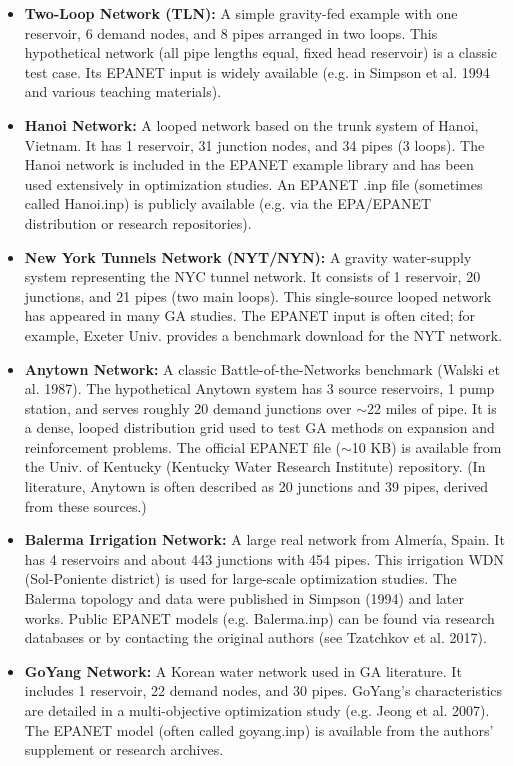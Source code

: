 \documentclass[12pt, a4paper]{article}
\begin{document}
\begin{itemize}
	\item \textbf{Two-Loop Network (TLN):} A simple gravity-fed example with one reservoir, 6 demand nodes, and 8 pipes arranged in two loops\cite{ref18}. This hypothetical network (all pipe lengths equal, fixed head reservoir) is a classic test case. Its EPANET input is widely available (e.g. in Simpson et al. 1994 and various teaching materials).
	\item \textbf{Hanoi Network:} A looped network based on the trunk system of Hanoi, Vietnam. It has 1 reservoir, 31 junction nodes, and 34 pipes (3 loops)\cite{ref19}. The Hanoi network is included in the EPANET example library and has been used extensively in optimization studies\cite{ref19}. An EPANET .inp file (sometimes called Hanoi.inp) is publicly available (e.g. via the EPA/EPANET distribution or research repositories).
	\item \textbf{New York Tunnels Network (NYT/NYN):} A gravity water-supply system representing the NYC tunnel network. It consists of 1 reservoir, 20 junctions, and 21 pipes (two main loops)\cite{ref19}. This single-source looped network has appeared in many GA studies. The EPANET input is often cited; for example, Exeter Univ. provides a benchmark download for the NYT network\cite{ref19}.
	\item \textbf{Anytown Network:} A classic Battle-of-the-Networks benchmark (Walski et al. 1987). The hypothetical Anytown system has 3 source reservoirs, 1 pump station, and serves roughly 20 demand junctions over $\sim$22 miles of pipe\cite{ref20}. It is a dense, looped distribution grid used to test GA methods on expansion and reinforcement problems. The official EPANET file ($\sim$10 KB) is available from the Univ. of Kentucky (Kentucky Water Research Institute) repository\cite{ref20}. (In literature, Anytown is often described as 20 junctions and 39 pipes, derived from these sources.)
	\item \textbf{Balerma Irrigation Network:} A large real network from Almería, Spain. It has 4 reservoirs and about 443 junctions with 454 pipes\cite{ref21}. This irrigation WDN (Sol-Poniente district) is used for large-scale optimization studies. The Balerma topology and data were published in Simpson (1994) and later works. Public EPANET models (e.g. Balerma.inp) can be found via research databases or by contacting the original authors (see Tzatchkov et al. 2017).
	\item \textbf{GoYang Network:} A Korean water network used in GA literature. It includes 1 reservoir, 22 demand nodes, and 30 pipes\cite{ref18}. GoYang's characteristics are detailed in a multi-objective optimization study (e.g. Jeong et al. 2007). The EPANET model (often called goyang.inp) is available from the authors' supplement or research archives.

\end{itemize}
\end{document}
